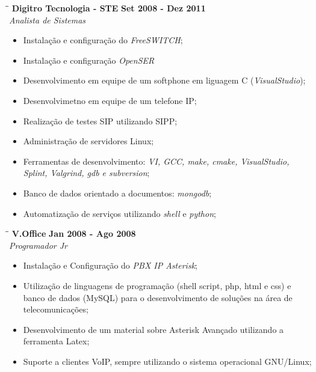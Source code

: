 \documentclass[margin]{res}
\begin{document}
\begin{resume}
   \begin{tabbing}
   \hspace{2.3in}\= \hspace{1.5in}\= \kill %
    \textbf{Digitro Tecnologia - STE}    \>\>\textbf{Set 2008 - Dez 2011}\\
    \textit{Analista de Sistemas}                         
   \end{tabbing}\vspace{-20pt}      %
    \vspace{5mm}
    \begin{itemize}
      \item Instalação e configuração do \textit{FreeSWITCH};
      \item Instalação e configuração \textit{OpenSER} 
      \item Desenvolvimento em equipe de um softphone em liguagem C (\textit{VisualStudio}); 
      \item Desenvolvimetno em equipe de um telefone IP; 
      \item Realização de testes SIP utilizando SIPP;  
      \item Administração de servidores Linux; 
      \item Ferramentas de desenvolvimento: \textit{VI, GCC, make, cmake, VisualStudio, Splint, Valgrind, gdb e subversion};
      \item Banco de dados orientado a documentos: \textit{mongodb}; 
      \item Automatização de serviços utilizando \textit{shell} e \textit{python};
    \end{itemize}

   \begin{tabbing}
   \hspace{2.3in}\= \hspace{1.5in}\= \kill %
    \textbf{V.Office}    \>\>\textbf{Jan 2008 - Ago 2008}\\
    \textit{Programador Jr}                         
   \end{tabbing}\vspace{-20pt}      %
    \vspace{5mm}
    \begin{itemize}
      \item Instalação e Configuração do \textit{PBX IP Asterisk};
      \item Utilização de linguagens de programação (shell script, php, html e css) e banco de dados (MySQL) para o 
	    desenvolvimento de soluções na área de telecomunicações; 
      \item Desenvolvimento de um material sobre Asterisk Avançado utilizando a ferramenta Latex; 
      \item Suporte a clientes VoIP, sempre utilizando o sistema operacional GNU/Linux;
    \end{itemize}


\end{resume}
\end{document}
